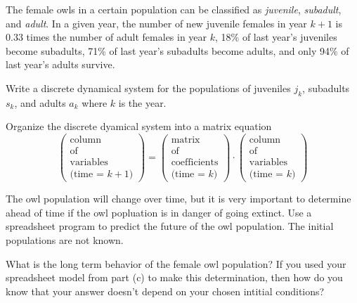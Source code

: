 % 
\begin{problem}
    The female owls in a certain population can be classified as {\it juvenile}, {\it subadult},
    and {\it adult}. In a given year, the number of new juvenile females in year $k+1$ is
    $0.33$ times the  number of adult females in year $k$, 18\% of last year's juveniles become subadults, 71\% of last
    year's subadults become adults, and only 94\% of last year's adults survive.
    \ba
        \item Write a discrete dynamical system for the populations of juveniles $j_k$,
            subadults $s_k$, and adults $a_k$ where $k$ is the year.
        \item Organize the discrete dyamical system into a matrix equation
            \[ \begin{pmatrix} \text{column} \\ \text{of}\\ \text{variables} \\ \text{(time
                = $k+1$)}  \end{pmatrix} = \begin{pmatrix} \text{matrix} \\ \text{of} \\
                \text{coefficients}\\ \text{(time = $k$)} \end{pmatrix} \cdot \begin{pmatrix} \text{column} \\
        \text{of} \\ \text{variables} \\ \text{(time = $k$)} \end{pmatrix}  \]
        \item The owl population will change over time, but it is very important to
            determine ahead of time if the owl popluation is in danger of going extinct.
            Use a spreadsheet program to predict the future of the owl population.  The
            initial populations are not known.
        \item What is the long term behavior of the female owl population?  If you used
            your spreadsheet model from part (c) to make this determination, then how do
            you know that your answer doesn't depend on your chosen intitial conditions?
    \ea

\end{problem}



